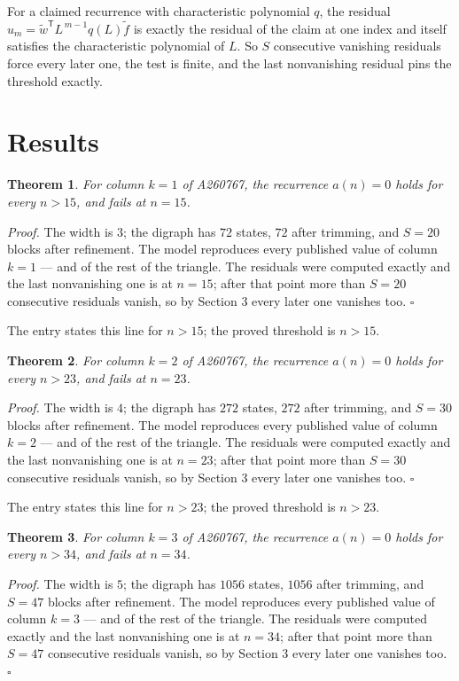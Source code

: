 \documentclass[11pt]{article}
\newtheorem{theorem}{Theorem}
\theoremstyle{definition}
\begin{document}
For a claimed recurrence with characteristic polynomial $q$, the residual $u_m = \tilde w^{\mathsf T}L^{\,m-1}q(L)\tilde f$ is exactly the residual of the claim at one index and itself satisfies the characteristic polynomial of $L$. So $S$ consecutive vanishing residuals force every later one, the test is finite, and the last nonvanishing residual pins the threshold exactly.

\section{Results}

\begin{theorem} For column $k = 1$ of A260767, the recurrence $a(n) = 0$ holds for every $n > 15$, and fails at $n = 15$.\end{theorem}

{\itshape Proof.} The width is $3$; the digraph has $72$ states, $72$ after trimming, and $S = 20$ blocks after refinement. The model reproduces every published value of column $k = 1$ --- and of the rest of the triangle. The residuals were computed exactly and the last nonvanishing one is at $n = 15$; after that point more than $S = 20$ consecutive residuals vanish, so by Section 3 every later one vanishes too. $\square$

The entry states this line for $n > 15$; the proved threshold is $n > 15$.

\begin{theorem} For column $k = 2$ of A260767, the recurrence $a(n) = 0$ holds for every $n > 23$, and fails at $n = 23$.\end{theorem}

{\itshape Proof.} The width is $4$; the digraph has $272$ states, $272$ after trimming, and $S = 30$ blocks after refinement. The model reproduces every published value of column $k = 2$ --- and of the rest of the triangle. The residuals were computed exactly and the last nonvanishing one is at $n = 23$; after that point more than $S = 30$ consecutive residuals vanish, so by Section 3 every later one vanishes too. $\square$

The entry states this line for $n > 23$; the proved threshold is $n > 23$.

\begin{theorem} For column $k = 3$ of A260767, the recurrence $a(n) = 0$ holds for every $n > 34$, and fails at $n = 34$.\end{theorem}

{\itshape Proof.} The width is $5$; the digraph has $1056$ states, $1056$ after trimming, and $S = 47$ blocks after refinement. The model reproduces every published value of column $k = 3$ --- and of the rest of the triangle. The residuals were computed exactly and the last nonvanishing one is at $n = 34$; after that point more than $S = 47$ consecutive residuals vanish, so by Section 3 every later one vanishes too. $\square$
\end{document}
